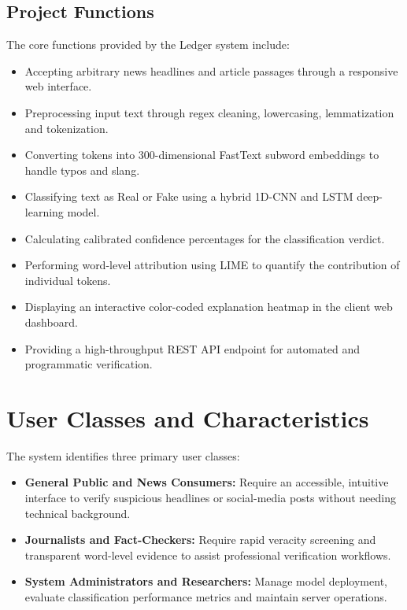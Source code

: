\documentclass[12pt,a4paper,oneside]{report}
\begin{document}
\subsection{Project Functions}

The core functions provided by the Ledger system include:

\begin{itemize}[leftmargin=*, itemsep=2pt]
  \item Accepting arbitrary news headlines and article passages through a responsive web interface.
  \item Preprocessing input text through regex cleaning, lowercasing, lemmatization and tokenization.
  \item Converting tokens into 300-dimensional FastText subword embeddings to handle typos and slang.
  \item Classifying text as Real or Fake using a hybrid 1D-CNN and LSTM deep-learning model.
  \item Calculating calibrated confidence percentages for the classification verdict.
  \item Performing word-level attribution using LIME to quantify the contribution of individual tokens.
  \item Displaying an interactive color-coded explanation heatmap in the client web dashboard.
  \item Providing a high-throughput REST API endpoint for automated and programmatic verification.
\end{itemize}

\section{User Classes and Characteristics}

The system identifies three primary user classes:

\begin{itemize}[leftmargin=*, itemsep=2pt]
  \item \textbf{General Public and News Consumers:} Require an accessible, intuitive interface to
        verify suspicious headlines or social-media posts without needing technical background.
  \item \textbf{Journalists and Fact-Checkers:} Require rapid veracity screening and transparent
        word-level evidence to assist professional verification workflows.
  \item \textbf{System Administrators and Researchers:} Manage model deployment, evaluate
        classification performance metrics and maintain server operations.
\end{itemize}
\end{document}
